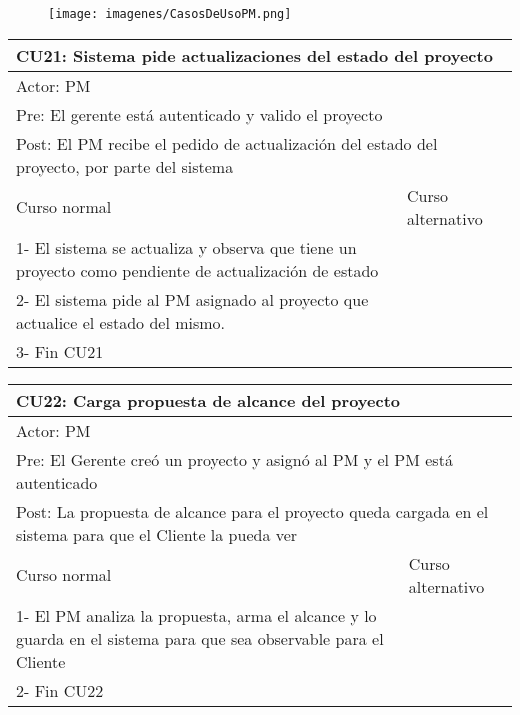 \begin{figure}[H]
    \texttt{[image: imagenes/CasosDeUsoPM.png]}
\end{figure}

\begin{table}[H]
  \begin{adjustbox}{max width = \textwidth}
  \begin{tabular}{|l|l|}
    \hline
    \multicolumn{2}{|l|}{CU21: Sistema pide actualizaciones del estado del proyecto} \\\hline
    \multicolumn{2}{|l|}{Actor: PM} \\\hline
    \multicolumn{2}{|l|}{Pre: El gerente está autenticado y valido el proyecto} \\\hline
    \multicolumn{2}{|l|}{Post: El PM recibe el pedido de actualización del estado del proyecto, por parte del sistema} \\\hline
     Curso normal & Curso alternativo\\ \hline
     1- El sistema se actualiza y observa que tiene un proyecto como pendiente de actualización de estado & \\ \hline
     2- El sistema pide al PM asignado al proyecto que actualice el estado del mismo. &\\ \hline
     3- Fin CU21 & \\ \hline
 \end{tabular}
  \end{adjustbox}
\end{table}

\begin{table}[H]
  \begin{adjustbox}{max width = \textwidth}
  \begin{tabular}{|l|l|}
    \hline
    \multicolumn{2}{|l|}{CU22: Carga propuesta de alcance del proyecto} \\\hline
    \multicolumn{2}{|l|}{Actor: PM} \\\hline
    \multicolumn{2}{|l|}{Pre: El Gerente creó un proyecto y asignó al PM y el PM está autenticado} \\\hline
    \multicolumn{2}{|l|}{Post: La propuesta de alcance para el proyecto queda cargada en el sistema para que el Cliente la pueda ver} \\\hline
     Curso normal & Curso alternativo\\ \hline
     1- El PM analiza la propuesta, arma el alcance y lo guarda en el sistema para que sea observable para el Cliente & \\ \hline
     2- Fin CU22 & \\ \hline
 \end{tabular}
  \end{adjustbox}
\end{table}


